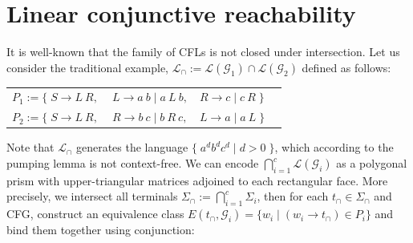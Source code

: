 \documentclass[sigplan,review,anonymous,acmsmall]{acmart}\settopmatter{printfolios=false,printccs=false,printacmref=false}
\begin{document}
\section{Linear conjunctive reachability}\label{sec:lclreach}

It is well-known that the family of CFLs is not closed under intersection. Let us consider the traditional example, $\mathcal{L}_\cap := \mathcal{L}(\mathcal{G}_1) \cap \mathcal{L}(\mathcal{G}_2)$ defined as follows:

\begin{table}[H]
\begin{tabular}{llll}
$P_1 := \big\{\;S \rightarrow L\:R,$ & $\:L \rightarrow a\:b \mid a\:L\:b,$ & $R \rightarrow c \mid c \:R\;\big\}$\vspace{5pt}\\
$P_2 := \big\{\;S \rightarrow L\:R,$ & $\:R \rightarrow b\:c \mid b\:R\:c,$ & $L \rightarrow a \mid a \:L\;\big\}$
\end{tabular}
\end{table}

\noindent Note that $\mathcal{L}_\cap$ generates the language $\big\{\;a^d b^d c^d \mid d > 0\;\big\}$, which according to the pumping lemma is not context-free. We can encode $\bigcap_{i=1}^c \mathcal{L}(\mathcal{G}_i)$ as a polygonal prism with upper-triangular matrices adjoined to each rectangular face. More precisely, we intersect all terminals $\Sigma_\cap := \bigcap_{i=1}^c \Sigma_i$, then for each $t_\cap \in \Sigma_\cap$ and CFG, construct an equivalence class $E(t_\cap, \mathcal{G}_i) = \{ w_i \mid (w_i \rightarrow t_\cap) \in P_i\}$ and bind them together using conjunction:\vspace{-5pt}
\end{document}
